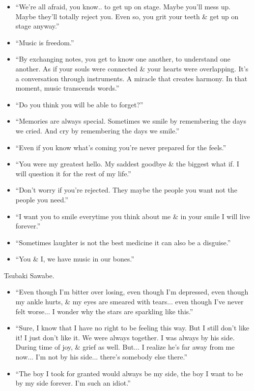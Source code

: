 \documentclass{article}
\begin{document}
\begin{enumerate}
\begin{itemize}
    	\item ``We're all afraid, you know.. to get up on stage. Maybe you'll mess up. Maybe they'll totally reject you. Even so, you grit your teeth \& get up on stage anyway.''
    	\item ``Music is freedom.''
    	\item ``By exchanging notes, you get to know one another, to understand one another. As if your souls were connected \& your hearts were overlapping. It's a conversation through instruments. A miracle that creates harmony. In that moment, music transcends words.''
    	\item ``Do you think you will be able to forget?''
    	\item ``Memories are always special. Sometimes we smile by remembering the days we cried. And cry by remembering the days we smile.''
    	\item ``Even if you know what's coming you're never prepared for the feels.''
    	\item ``You were my greatest hello. My saddest goodbye \& the biggest what if. I will question it for the rest of my life.''
    	\item ``Don't worry if you're rejected. They maybe the people you want not the people you need.''
    	\item ``I want you to smile everytime you think about me \& in your smile I will live forever.''
    	\item ``Sometimes laughter is not the best medicine it can also be a disguise.''
    	\item ``You \& I, we have music in our bones.''
    \end{itemize}
    {\sc Tsubaki Sawabe.}
    \begin{itemize}
    	\item ``Even though I'm bitter over losing, even though I'm depressed, even though my ankle hurts, \& my eyes are smeared with tears... even though I've never felt worse... I wonder why the stars are sparkling like this.'' 
    	\item ``Sure, I know that I have no right to be feeling this way. But I still don't like it! I just don't like it. We were always together. I was always by his side. During time of joy, \& grief as well. But... I realize he's far away from me now... I'm not by his side... there's somebody else there.''
    	\item ``The boy I took for granted would always be my side, the boy I want to be by my side forever. I'm such an idiot.''

\end{itemize}
\end{enumerate}
\end{document}
